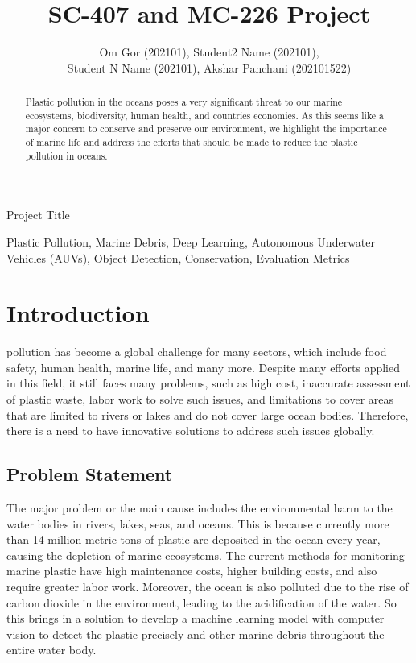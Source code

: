 \documentclass[lettersize,journal]{IEEEtran}
\begin{document}
\title{SC-407 and MC-226 Project}

\author{Om Gor (202101), Student2 Name (202101),\\ Student N Name (202101), Akshar Panchani (202101522)}

%
{Project Title}


\maketitle

\begin{abstract}
Plastic pollution in the oceans poses a very significant threat to our marine ecosystems, biodiversity, human health, and countries economies. As this seems like a major concern to conserve and preserve our environment, we highlight the importance of marine life and address the efforts that should be made to reduce the plastic pollution in oceans.
\end{abstract}

\begin{IEEEkeywords}
Plastic Pollution, Marine Debris, Deep Learning, Autonomous Underwater Vehicles (AUVs), Object Detection, Conservation, Evaluation Metrics
\end{IEEEkeywords}

\section{Introduction}
 pollution has become a global challenge for many sectors, which include food safety, human health, marine life, and many more. Despite many efforts applied in this field, it still faces many problems, such as high cost, inaccurate assessment of plastic waste, labor work to solve such issues, and limitations to cover areas that are limited to rivers or lakes and do not cover large ocean bodies. Therefore, there is a need to have innovative solutions to address such issues globally.



\subsection{Problem Statement}
The major problem or the main cause includes the environmental harm to the water bodies in rivers, lakes, seas, and oceans. This is because currently more than 14 million metric tons of plastic are deposited in the ocean every year, causing the depletion of marine ecosystems. The current methods for monitoring marine plastic have high maintenance costs, higher building costs, and also require greater labor work. Moreover, the ocean is also polluted due to the rise of carbon dioxide in the environment, leading to the acidification of the water. So this brings in a solution to develop a machine learning model with computer vision to detect the plastic precisely and other marine debris throughout the entire water body.
\end{document}
